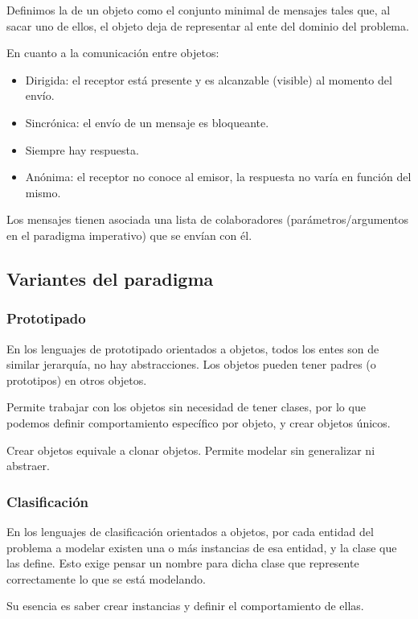 Definimos la  de un objeto como el conjunto minimal de mensajes tales que, al sacar uno de ellos, el objeto deja de representar al ente del dominio del problema.

 En cuanto a la comunicación entre objetos:
\begin{itemize}
  \item Dirigida: el receptor está presente y es alcanzable (visible) al momento del envío.
  \item Sincrónica: el envío de un mensaje es bloqueante.
  \item Siempre hay respuesta.
  \item Anónima: el receptor no conoce al emisor, la respuesta no varía en función del mismo.
\end{itemize}

Los mensajes tienen asociada una lista de colaboradores (parámetros/argumentos en el paradigma imperativo) que se envían con él.

\subsection{Variantes del paradigma}
\subsubsection{Prototipado}

En los lenguajes de prototipado orientados a objetos, todos los entes son de similar jerarquía, no hay abstracciones. Los objetos pueden tener padres (o prototipos) en otros objetos.

Permite trabajar con los objetos sin necesidad de tener clases, por lo que podemos definir comportamiento específico por objeto, y crear objetos únicos.

Crear objetos equivale a clonar objetos. Permite modelar sin generalizar ni abstraer.

\subsubsection{Clasificación}

En los lenguajes de clasificación orientados a objetos, por cada entidad del problema a modelar existen una o más instancias de esa entidad, y la clase que las define. Esto exige pensar un nombre para dicha clase que represente correctamente lo que se está modelando.

Su esencia es saber crear instancias y definir el comportamiento de ellas.

